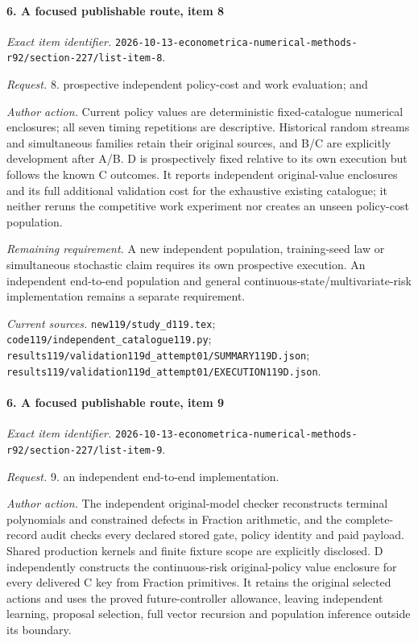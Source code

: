 \paragraph{6. A focused publishable route, item 8}

\emph{Exact item identifier.} \nolinkurl{2026-10-13-econometrica-numerical-methods-r92/section-227/list-item-8}.

\par\emph{Request.} 8. prospective independent policy-cost and work evaluation; and

\par\emph{Author action.} Current policy values are deterministic fixed-catalogue numerical enclosures; all seven timing repetitions are descriptive. Historical random streams and simultaneous families retain their original sources, and B/\allowbreak{}C are explicitly development after A/\allowbreak{}B. D is prospectively fixed relative to its own execution but follows the known C outcomes. It reports independent original-value enclosures and its full additional validation cost for the exhaustive existing catalogue; it neither reruns the competitive work experiment nor creates an unseen policy-cost population.

\par\emph{Remaining requirement.} A new independent population, training-seed law or simultaneous stochastic claim requires its own prospective execution. An independent end-to-end population and general continuous-state/\allowbreak{}multivariate-risk implementation remains a separate requirement.

\par\emph{Current sources.} \nolinkurl{new119/study_d119.tex}; \nolinkurl{code119/independent_catalogue119.py}; \nolinkurl{results119/validation119d_attempt01/SUMMARY119D.json}; \nolinkurl{results119/validation119d_attempt01/EXECUTION119D.json}.

\paragraph{6. A focused publishable route, item 9}

\emph{Exact item identifier.} \nolinkurl{2026-10-13-econometrica-numerical-methods-r92/section-227/list-item-9}.

\par\emph{Request.} 9. an independent end-to-end implementation.

\par\emph{Author action.} The independent original-model checker reconstructs terminal polynomials and constrained defects in Fraction arithmetic, and the complete-record audit checks every declared stored gate, policy identity and paid payload. Shared production kernels and finite fixture scope are explicitly disclosed. D independently constructs the continuous-risk original-policy value enclosure for every delivered C key from Fraction primitives. It retains the original selected actions and uses the proved future-controller allowance, leaving independent learning, proposal selection, full vector recursion and population inference outside its boundary.

